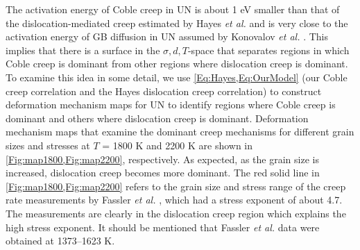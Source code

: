 \documentclass[preprint, 12pt]{elsarticle}
\newcommand{\?}{\stackrel{?}{=}}
\begin{document}
The activation energy of Coble creep in UN is about 1 eV smaller than that of the dislocation-mediated creep estimated by Hayes \textit{et al.} \cite{Hayes1990II} and is very close to the activation energy of GB diffusion in UN assumed by Konovalov \textit{et al.} \cite{Konovalov2016}. This implies that there is a surface in the $\sigma, d, T$-space that separates regions in which Coble creep is dominant from other regions where dislocation creep is dominant. To examine this idea in some detail, we use \cref{Eq:Hayes,Eq:OurModel} (our Coble creep correlation and the Hayes dislocation creep correlation) to construct deformation mechanism maps for UN to identify regions where Coble creep is dominant and others where dislocation creep is dominant. Deformation mechanism maps that examine the dominant creep mechanisms for different grain sizes and stresses at $T$ = 1800 K and 2200 K are shown in \cref{Fig:map1800,Fig:map2200}, respectively. As expected, as the grain size is increased, dislocation creep becomes more dominant. The red solid line in \cref{Fig:map1800,Fig:map2200} refers to the grain size and stress range of the creep rate measurements by Fassler \textit{et al.} \cite{Fassler1965}, which had a stress exponent of about 4.7. The measurements are clearly in the dislocation creep region which explains the high stress exponent. It should be mentioned that Fassler \textit{et al.} data were obtained at 1373--1623 K.
\end{document}
